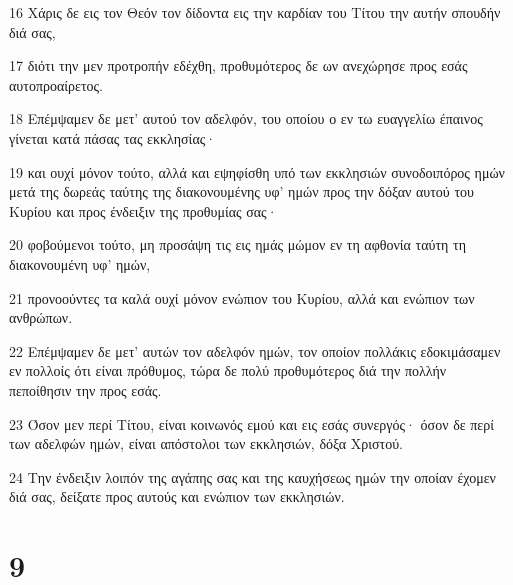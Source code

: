 \par 16 Χάρις δε εις τον Θεόν τον δίδοντα εις την καρδίαν του Τίτου την αυτήν σπουδήν διά σας,
\par 17 διότι την μεν προτροπήν εδέχθη, προθυμότερος δε ων ανεχώρησε προς εσάς αυτοπροαίρετος.
\par 18 Επέμψαμεν δε μετ' αυτού τον αδελφόν, του οποίου ο εν τω ευαγγελίω έπαινος γίνεται κατά πάσας τας εκκλησίας·
\par 19 και ουχί μόνον τούτο, αλλά και εψηφίσθη υπό των εκκλησιών συνοδοιπόρος ημών μετά της δωρεάς ταύτης της διακονουμένης υφ' ημών προς την δόξαν αυτού του Κυρίου και προς ένδειξιν της προθυμίας σας·
\par 20 φοβούμενοι τούτο, μη προσάψη τις εις ημάς μώμον εν τη αφθονία ταύτη τη διακονουμένη υφ' ημών,
\par 21 προνοούντες τα καλά ουχί μόνον ενώπιον του Κυρίου, αλλά και ενώπιον των ανθρώπων.
\par 22 Επέμψαμεν δε μετ' αυτών τον αδελφόν ημών, τον οποίον πολλάκις εδοκιμάσαμεν εν πολλοίς ότι είναι πρόθυμος, τώρα δε πολύ προθυμότερος διά την πολλήν πεποίθησιν την προς εσάς.
\par 23 Όσον μεν περί Τίτου, είναι κοινωνός εμού και εις εσάς συνεργός· όσον δε περί των αδελφών ημών, είναι απόστολοι των εκκλησιών, δόξα Χριστού.
\par 24 Την ένδειξιν λοιπόν της αγάπης σας και της καυχήσεως ημών την οποίαν έχομεν διά σας, δείξατε προς αυτούς και ενώπιον των εκκλησιών.

\chapter{9}

